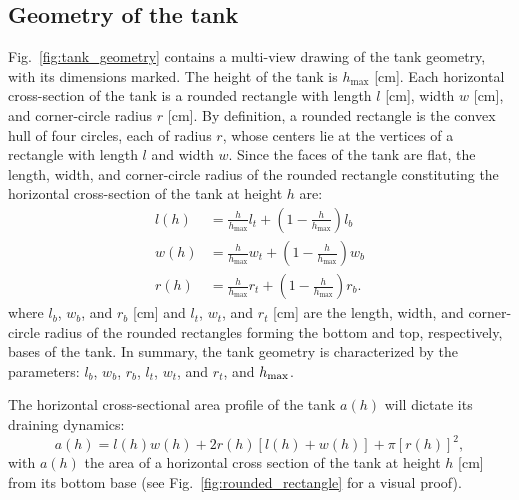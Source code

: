 \documentclass[a4paper,fleqn]{cas-dc}
\begin{document}
\subsection{Geometry of the tank}
Fig.~\ref{fig:tank_geometry} contains a multi-view drawing of the tank geometry, with its dimensions marked.
The height of the tank is $h_{\text{max}}$ [cm].
Each horizontal cross-section of the tank is a rounded rectangle with length $l$ [cm], width $w$ [cm], and corner-circle radius $r$ [cm].
By definition, a rounded rectangle is the convex hull of four circles, each of radius $r$, whose centers lie at the vertices of a rectangle with length $l$ and width $w$. \cite{rounded_rect}
Since the faces of the tank are flat, the length, width, and corner-circle radius of the rounded rectangle constituting the horizontal cross-section of the tank at height $h$ are:
\begin{align}
	l(h) &= \frac{h}{h_{\text{max}}}l_t + \left(1-\frac{h}{h_{\text{max}}}\right) l_b \\
	w(h) &= \frac{h}{h_{\text{max}}}w_t + \left(1-\frac{h}{h_{\text{max}}}\right) w_b \\
	r(h) &= \frac{h}{h_{\text{max}}}r_t + \left(1-\frac{h}{h_{\text{max}}}\right) r_b.
\end{align}
where $l_b$, $w_b$, and $r_b$ [cm] and $l_t$, $w_t$, and $r_t$ [cm] are the length, width, and corner-circle radius of the rounded rectangles forming the bottom and top, respectively, bases of the tank.
In summary, the tank geometry is characterized by the parameters: $l_b$, $w_b$, $r_b$, $l_t$, $w_t$, and $r_t$, and $h_{\rm max}$.

The horizontal cross-sectional area profile of the tank $a(h)$ will dictate its draining dynamics:
\begin{equation}
	a(h) = l(h) w(h) + 2 r(h) [l(h) + w(h)] + \pi [r(h)]^2, \label{eq:a_of_h}
\end{equation}
with $a(h)$ the area of a horizontal cross section of the tank at height $h$ [cm] from its bottom base (see Fig.~\ref{fig:rounded_rectangle} for a visual proof).
%
\end{document}
